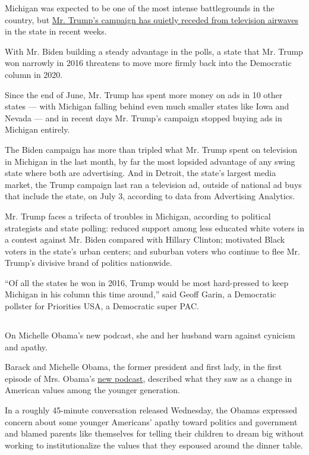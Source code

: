 Michigan was expected to be one of the most intense battlegrounds in the
country, but
\href{https://www.nytimes.com/2020/07/29/us/politics/michigan-trump-biden-2020.html}{Mr.
Trump's campaign has quietly receded from television airwaves} in the
state in recent weeks.

With Mr. Biden building a steady advantage in the polls, a state that
Mr. Trump won narrowly in 2016 threatens to move more firmly back into
the Democratic column in 2020.

Since the end of June, Mr. Trump has spent more money on ads in 10 other
states --- with Michigan falling behind even much smaller states like
Iowa and Nevada --- and in recent days Mr. Trump's campaign stopped
buying ads in Michigan entirely.

The Biden campaign has more than tripled what Mr. Trump spent on
television in Michigan in the last month, by far the most lopsided
advantage of any swing state where both are advertising. And in Detroit,
the state's largest media market, the Trump campaign last ran a
television ad, outside of national ad buys that include the state, on
July 3, according to data from Advertising Analytics.

Mr. Trump faces a trifecta of troubles in Michigan, according to
political strategists and state polling: reduced support among less
educated white voters in a contest against Mr. Biden compared with
Hillary Clinton; motivated Black voters in the state's urban centers;
and suburban voters who continue to flee Mr. Trump's divisive brand of
politics nationwide.

``Of all the states he won in 2016, Trump would be most hard-pressed to
keep Michigan in his column this time around,'' said Geoff Garin, a
Democratic pollster for Priorities USA, a Democratic super PAC.

\hypertarget{-6}{%
\subsection{}\label{-6}}

On Michelle Obama's new podcast, she and her husband warn against
cynicism and apathy.

Barack and Michelle Obama, the former president and first lady, in the
first episode of Mrs. Obama's
\href{https://open.spotify.com/episode/5JzuNYOm8p6u5WzU9VBWid?si=c7VOtFFySRKvf3Cl00VZxw}{new
podcast}, described what they saw as a change in American values among
the younger generation.

In a roughly 45-minute conversation released Wednesday, the Obamas
expressed concern about some younger Americans' apathy toward politics
and government and blamed parents like themselves for telling their
children to dream big without working to institutionalize the values
that they espoused around the dinner table.

